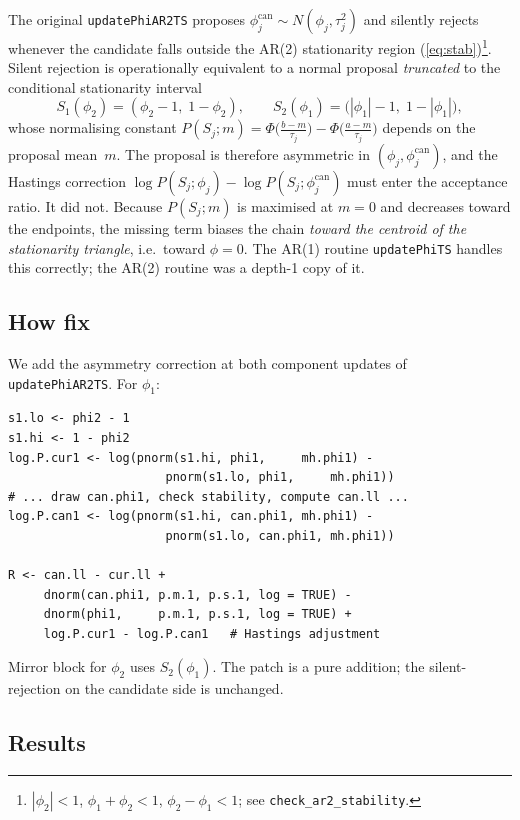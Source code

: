 \documentclass[11pt]{article}
\newcommand{\eref}[1]{(\ref{#1})}
\begin{document}
The original \texttt{updatePhiAR2TS} proposes
$\phi_j^{\text{can}} \sim N(\phi_j, \tau_j^2)$ and silently rejects whenever
the candidate falls outside the AR(2) stationarity region
\eref{eq:stab}\footnote{$|\phi_2|<1$, $\phi_1+\phi_2<1$, $\phi_2-\phi_1<1$;
see \texttt{check\_ar2\_stability}.}. Silent rejection is operationally
equivalent to a normal proposal \emph{truncated} to the conditional
stationarity interval
\[
  S_1(\phi_2) = (\phi_2 - 1,\; 1 - \phi_2),
  \qquad
  S_2(\phi_1) = \bigl(|\phi_1| - 1,\; 1 - |\phi_1|\bigr),
\]
whose normalising constant
$P(S_j; m) = \Phi\!\bigl(\tfrac{b-m}{\tau_j}\bigr) - \Phi\!\bigl(\tfrac{a-m}{\tau_j}\bigr)$
depends on the proposal mean~$m$. The proposal is therefore asymmetric in
$(\phi_j, \phi_j^{\text{can}})$, and the Hastings correction
$\log P(S_j; \phi_j) - \log P(S_j; \phi_j^{\text{can}})$ must enter the
acceptance ratio. It did not. Because $P(S_j; m)$ is maximised at $m = 0$
and decreases toward the endpoints, the missing term biases the chain
\emph{toward the centroid of the stationarity triangle}, i.e.\ toward $\phi=0$.
The AR(1) routine \texttt{updatePhiTS} handles this correctly; the AR(2)
routine was a depth-1 copy of it.

\subsection{How fix}

We add the asymmetry correction at both component updates of
\texttt{updatePhiAR2TS}. For $\phi_1$:
\begin{lstlisting}
s1.lo <- phi2 - 1
s1.hi <- 1 - phi2
log.P.cur1 <- log(pnorm(s1.hi, phi1,     mh.phi1) -
                      pnorm(s1.lo, phi1,     mh.phi1))
# ... draw can.phi1, check stability, compute can.ll ...
log.P.can1 <- log(pnorm(s1.hi, can.phi1, mh.phi1) -
                      pnorm(s1.lo, can.phi1, mh.phi1))

R <- can.ll - cur.ll +
     dnorm(can.phi1, p.m.1, p.s.1, log = TRUE) -
     dnorm(phi1,     p.m.1, p.s.1, log = TRUE) +
     log.P.cur1 - log.P.can1   # Hastings adjustment
\end{lstlisting}
Mirror block for $\phi_2$ uses $S_2(\phi_1)$. The patch is a pure addition;
the silent-rejection on the candidate side is unchanged.

\subsection{Results}
\end{document}
